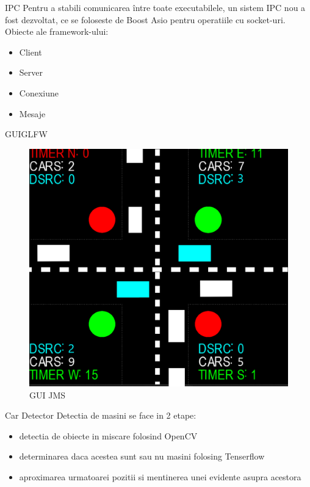 \documentclass{beamer}
\begin{document}
    \begin{frame}{IPC}
        Pentru a stabili comunicarea între toate executabilele, un sistem IPC nou
        a fost dezvoltat, ce se foloseste de Boost Asio pentru operatiile cu socket-uri.
        Obiecte ale framework-ului:
        \begin{itemize}[<+-| alert@+>]
            \item Client
            \item Server
            \item Conexiune
            \item Mesaje
        \end{itemize}

    \end{frame}
    \begin{frame}{GUIGLFW}
        \begin{figure}[h!]
            \includegraphics[width=(\textwidth / 3) * 2]{running/GUI_JMS.png}
            \caption{GUI JMS}
            \label{fig:GUI JMS}
        \end{figure}

    \end{frame}
    \begin{frame}{Car Detector}
        Detectia de masini se face in 2 etape:
        \begin{itemize}[<+-| alert@+>]
            \item detectia de obiecte in miscare folosind OpenCV
            \item determinarea daca acestea sunt sau nu masini folosing Tenserflow
            \item aproximarea urmatoarei pozitii si mentinerea unei evidente asupra acestora
        \end{itemize}
    \end{frame}
\end{document}
